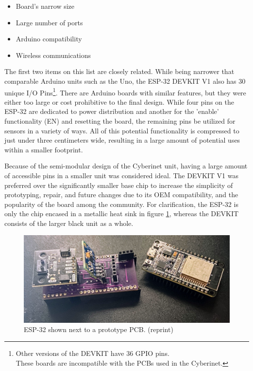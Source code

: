 \begin{itemize}
    \item Board's narrow size
    \item Large number of ports
    \item Arduino compatibility
    \item Wireless communications
\end{itemize}

The first two items on this list are closely related. While being narrower that comparable Arduino units such as the Uno, the ESP-32 DEVKIT V1 also has 30 unique I/O Pins\footnote{Other versions of the DEVKIT have 36 GPIO pins. \\These boards are incompatible with the PCBs used in the Cyberinet.}. There are Arduino boards with similar features, but they were either too large or cost prohibitive to the final design. While four pins on the ESP-32 are dedicated to power distribution and another for the 'enable' functionality (EN) and resetting the board, the remaining pins be utilized for sensors in a variety of ways. All of this potential functionality is compressed to just under three centimeters wide, resulting in a large amount of potential uses within a smaller footprint. 

Because of the semi-modular design of the Cyberinet unit, having a large amount of accessible pins in a smaller unit was considered ideal. The DEVKIT V1 was preferred over the significantly smaller base chip to increase the simplicity of prototyping, repair, and future changes due to its OEM compatibility, and the popularity of the board among the community. For clarification, the ESP-32 is only the chip encased in a metallic heat sink in figure \ref{fig:protoBoard2.1}, whereas the DEVKIT consists of the larger black unit as a whole.

\begin{figure}
    \centering
    \includegraphics[scale=0.15]{diagrams/builtUnits/protoBoard.JPG}
    \caption{ESP-32 shown next to a prototype PCB. (reprint)}
    \label{fig:protoBoard2.1}
\end{figure}

